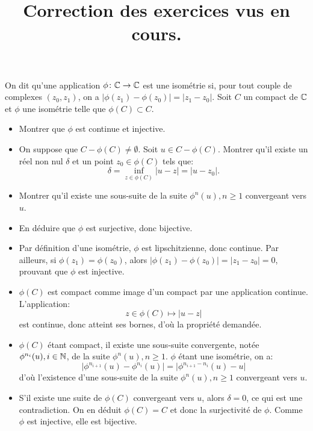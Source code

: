 \documentclass[a4paper, 12pt]{amsart}
\title{Correction des exercices vus en cours.}
\begin{document}
\maketitle
\begin{fex}
    On dit qu'une application $\phi \colon \mathbb{C} \to \mathbb{C}$ est une isométrie si, pour tout couple
    de complexes $(z_0,z_1)$, on a $\lvert \phi(z_1)-\phi(z_0)\rvert = \lvert z_1-z_0\rvert.$ 
    Soit $C$ un compact de $\mathbb{C}$ et $\phi$ une isométrie telle que $\phi(C) \subset C.$
    \begin{itemize}
        \item Montrer que $\phi$ est continue et injective.
        \item On suppose que $C-\phi(C) \neq \emptyset.$ Soit $u \in C -\phi(C).$ Montrer qu'il existe un réel non nul $\delta$ et un point $z_0 \in \phi(C)$ tels que:
        \[
        \delta = \inf_{z \in \phi(C)} \lvert u - z \rvert = \lvert u - z_0 \rvert.
        \]
        \item Montrer qu'il existe une sous-suite de la suite $\phi^n(u), n \geq 1$ convergeant 
        vers $u$.
        \item En déduire que $\phi$ est surjective, donc bijective.
    \end{itemize}
\end{fex}
\begin{itemize}
    \item Par définition d'une isométrie, $\phi$ est lipschitzienne, donc continue. Par ailleurs, si $\phi(z_1)=\phi(z_0)$, alors $\lvert \phi(z_1) - \phi(z_0)\rvert = \lvert z_1 - z_0 \rvert = 0$, prouvant que $\phi$ est injective.
    \item $\phi(C)$ est compact comme image d'un compact par une application continue. L'application:
    \[
        z \in \phi(C) \mapsto \lvert u- z \rvert 
    \]
    est continue, donc atteint ses bornes, d'où la propriété demandée.
    \item $\phi(C)$ étant compact, il existe une sous-suite convergente, notée $\phi^{n_i}(u), i \in \mathbb{N}$, de la suite $\phi^{n}(u), n \geq 1$. $\phi$ étant une isométrie, on a:
    \[
    \lvert \phi^{n_{i+1}}(u) - \phi^{n_i}(u)  \rvert = \lvert \phi^{n_{i+1}-n_i}(u) - u \rvert
    \]
    d'où l'existence d'une sous-suite de la suite $\phi^{n}(u), n \geq 1$ convergeant vers $u$.
    \item S'il existe une suite de $\phi(C)$ convergeant vers $u$, alors $\delta=0$, ce qui est une contradiction. On en déduit $\phi(C)=C$ et donc la surjectivité de $\phi.$ Comme $\phi$ est injective, elle est bijective.
\end{itemize}
\end{document}
